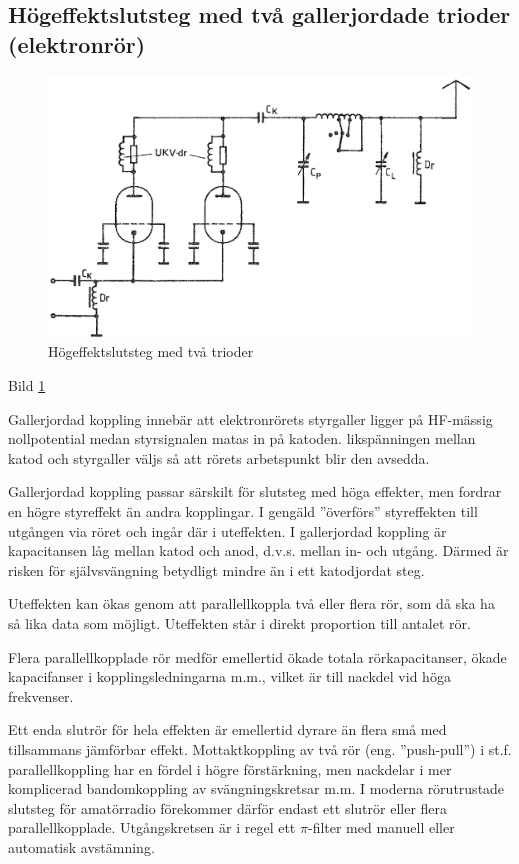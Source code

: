 \subsection{Högeffektslutsteg med två gallerjordade trioder (elektronrör)}

\begin{figure}
\includegraphics[width=\textwidth]{images/cropped_pdfs/bild_2_3-51.pdf}
\caption{Högeffektslutsteg med två trioder}
\label{fig:BildII3-51}
\end{figure}

Bild \ref{fig:BildII3-51}

Gallerjordad koppling innebär att elektronrörets styrgaller ligger på
HF-mässig nollpotential medan styrsignalen matas in på
katoden. likspänningen mellan katod och styrgaller väljs så att rörets
arbetspunkt blir den avsedda.

Gallerjordad koppling passar särskilt för slutsteg med höga effekter,
men fordrar en högre styreffekt än andra kopplingar. I gengäld
''överförs'' styreffekten till utgången via röret och ingår där i
uteffekten. I gallerjordad koppling är kapacitansen låg mellan katod
och anod, d.v.s. mellan in- och utgång. Därmed är risken för
självsvängning betydligt mindre än i ett katodjordat steg.

Uteffekten kan ökas genom att parallellkoppla två eller flera rör, som
då ska ha så lika data som möjligt. Uteffekten står i direkt
proportion till antalet rör.

Flera parallellkopplade rör medför emellertid ökade totala
rörkapacitanser, ökade kapacifanser i kopplingsledningarna m.m.,
vilket är till nackdel vid höga frekvenser.

Ett enda slutrör för hela effekten är emellertid dyrare än flera små
med tillsammans jämförbar effekt. Mottaktkoppling av två rör
(eng. ''push-pull'') i st.f. parallellkoppling har en fördel i högre
förstärkning, men nackdelar i mer komplicerad bandomkoppling av
svängningskretsar m.m. I moderna rörutrustade slutsteg för amatörradio
förekommer därför endast ett slutrör eller flera
parallellkopplade. Utgångskretsen är i regel ett \(\pi \)-filter med manuell
eller automatisk avstämning.

